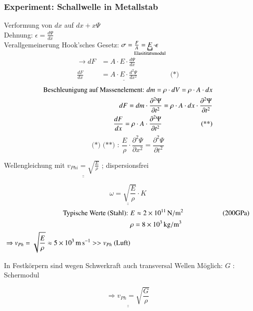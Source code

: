 \subsubsection{Experiment: Schallwelle in Metallstab}
\enter
\bild
Verformung von $ dx $ auf $ dx+x\Psi $\\
Dehnung: $ \epsilon = \frac{d\Psi}{dx} $\\
Verallgemeinerung Hook'sches Gesetz: $ \sigma = \frac{F}{A} = \underbracket{E}_{\mathclap{\text{Elasititätsmodul}}} \cdot \epsilon$\\
\begin{align*}
\rightarrow dF &= A \cdot E \cdot \frac{d\Psi}{dx}\\
\frac{dF}{dx} &= \underline{A \cdot E \cdot \frac{d^2\Psi}{dx^2}} \hspace{2cm} \text{(*)}
\end{align*}
\begin{align*}
\text{Beschleunigung auf Massenelement: }  dm = \rho\cdot dV = \rho\cdot A \cdot dx \\
dF = dm \cdot \frac{\partial^2\Psi}{\partial t^2} = \rho \cdot A \cdot dx \cdot \frac{\partial^2\Psi}{\partial t^2}\\
\frac{dF}{dx} = \rho \cdot A \cdot \frac{\partial^2\Psi}{\partial t^2} \hspace{2cm} \text{(**)}
\enter
\end{align*}
$$ \text{(*) (**) : } \boxed{\frac{E}{\rho} \cdot \frac{\partial^2\Psi}{\partial x^2} =  \frac{\partial^2 \Psi}{\partial t^2}} $$
\begin{center}
	Wellengleichung mit $ \underline{\underline{v_{Phi} = \sqrt{\frac{E}{\rho}}}} $ ; dispersionsfrei
\end{center}
$$ \underline{\underline{\omega = \sqrt{\frac{E}{\rho}} \cdot K}} $$
\begin{align*}
\text{Typische Werte (Stahl): } &E \approx \SI{2E11}{\newton\per\meter^2} \hspace{2cm} (200\si{\giga\pascal}) \\
&\rho = \SI{8E3}{\kilogram\per\meter^3}\\
\Rightarrow v_{Ph} = \sqrt{\frac{E}{\rho}} \approx \SI{5E3}{\meter\per\second} >> v_{Ph} \text{ (Luft)}
\end{align*}

In Festkörpern sind wegen Schwerkraft auch transversal Wellen Möglich: \hspace{2cm} $ G $ : Schermodul

$$ \underline{\underline{\Rightarrow v_{Ph} = \sqrt{\frac{G}{\rho}}}} $$

